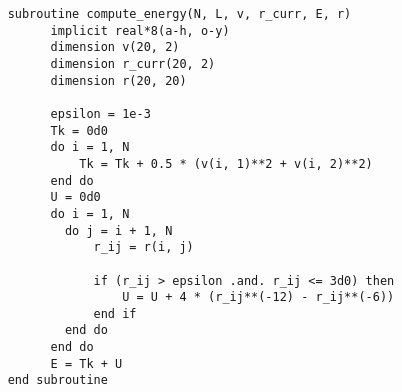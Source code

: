 \begin{verbatim}
    subroutine compute_energy(N, L, v, r_curr, E, r)
          implicit real*8(a-h, o-y)
          dimension v(20, 2)
          dimension r_curr(20, 2)
          dimension r(20, 20)

          epsilon = 1e-3
          Tk = 0d0
          do i = 1, N
              Tk = Tk + 0.5 * (v(i, 1)**2 + v(i, 2)**2)
          end do
          U = 0d0
          do i = 1, N
            do j = i + 1, N
                r_ij = r(i, j)

                if (r_ij > epsilon .and. r_ij <= 3d0) then
                    U = U + 4 * (r_ij**(-12) - r_ij**(-6))
                end if
            end do
          end do
          E = Tk + U
    end subroutine
\end{verbatim}